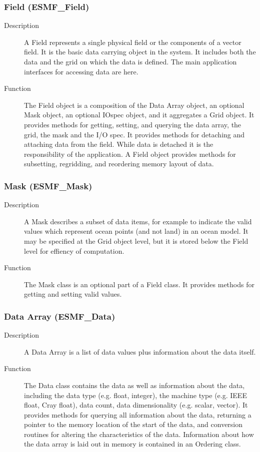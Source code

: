 \subsubsection{Field (ESMF\_Field)}
\label{sec:field} 
\begin{description} 
\item [Description] A Field represents a single physical field or the components of a 
vector field.  It is the basic data carrying object in the system.  It includes both
the data and the grid on which the data is defined.  The main application interfaces
for accessing data are here.
\item [Function] The Field object is a composition of the Data Array object, an optional
Mask object, an optional IOspec object, and it aggregates a Grid object.  It provides
methods for getting, setting, and querying the data array, the grid, the mask and
the I/O spec.  It provides methods for detaching and attaching data from the field.
While data is detached it is the responsibility of the application.  A Field object
provides methods for subsetting, regridding, and reordering memory layout of data.
\end{description}

\subsubsection{Mask (ESMF\_Mask)}
\label{sec:mask} 
\begin{description}
\item [Description] A Mask describes a subset of data items, for example to indicate
the valid values which represent ocean points (and not land) in an ocean model.  
It may be specified at the Grid object level, but it is stored below the Field level 
for effiency of computation.
\item [Function] The Mask class is an optional part of a Field class.  It provides methods
for getting and setting valid values.
\end{description}

\subsubsection{Data Array (ESMF\_Data)}
\label{sec:dataarray} 
\begin{description}
\item [Description] A Data Array is a list of data values plus information about
the data itself.
\item [Function] The Data class contains the data as well as information about the data,
including the data type (e.g. float,
integer), the machine type (e.g. IEEE float, Cray float), data count, data dimensionality
(e.g. scalar, vector).  It provides methods for querying all information about the data,
returning a pointer to the memory location of the start of the data, and conversion routines
for altering the characteristics of the data.  Information about how the data array is laid
out in memory is contained in an Ordering class.
\end{description}

